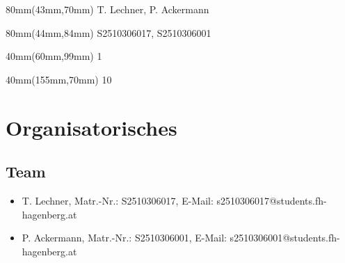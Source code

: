 

\newcommand{\docproject}{Autovermietung}			%
\newcommand{\docsubject}{Software Design Patterns}	%
\newcommand{\docsubjectshort}{SDP3}					%
\newcommand{\docexercise}{Übung 7}					%
\newcommand{\docauthor}{T. Lechner}					%
\newcommand{\doccoauthor}{P. Ackermann}				%
\newcommand{\docauthornumber}{S2510306017}			%
\newcommand{\doccoauthornumber}{S2510306001}		%
\newcommand{\docauthoremail}{s2510306017@students.fh-hagenberg.at}
\newcommand{\doccoauthoremail}{s2510306001@students.fh-hagenberg.at}
\newcommand{\docdate}{\date}						%
\newcommand{\docsemester}{Wintersemester 2026/2027}	%




\begin{textblock*}{80mm}(43mm,70mm)
	\docauthor, \doccoauthor
\end{textblock*}
\begin{textblock*}{80mm}(44mm,84mm)
	\docauthornumber, \doccoauthornumber
\end{textblock*}
\begin{textblock*}{40mm}(60mm,99mm)
	1 					%
\end{textblock*}
\begin{textblock*}{40mm}(155mm,70mm)
	10					%
\end{textblock*}


\newpage
\hgbtitle
\newpage



\tableofcontents
\newpage


\section{Organisatorisches}

\subsection{Team}
\begin{itemize}
	\item \docauthor, Matr.-Nr.: \docauthornumber, E-Mail: \docauthoremail	
	\item \doccoauthor, Matr.-Nr.: \doccoauthornumber, E-Mail: \doccoauthoremail
\end{itemize}


